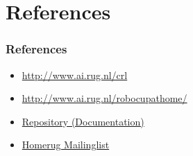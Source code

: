 \documentclass[]{beamer}
\begin{document}
\section{References}
\begin{frame}
    \frametitle{References}
    \begin{itemize}
        \item \url{http://www.ai.rug.nl/crl}
        \item \url{http://www.ai.rug.nl/robocupathome/}
        \item \url{Repository (Documentation)}
        \item \url{Homerug Mailinglist}
    \end{itemize}
\end{frame}
\end{document}
